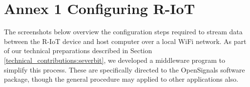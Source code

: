 

\chapter{Annex 1 Configuring R-IoT}
\label{ann:riot_opensignals}

The screenshots below overview the configuration steps required to stream data between the R-IoT device and host computer over a local WiFi network. As part of our technical preparations described in Section \ref{technical_contributions:severbit}, we developed a middleware program to simplify this process. These are specifically directed to the OpenSignals software package, though the general procedure may applied to other applications also.

